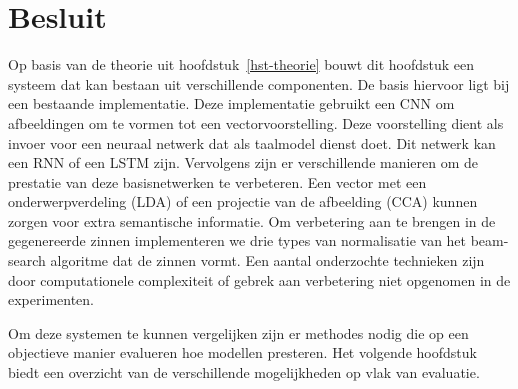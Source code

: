 \section{Besluit}
Op basis van de theorie uit hoofdstuk~\ref{hst-theorie} bouwt dit hoofdstuk een systeem dat kan bestaan uit verschillende componenten. De basis hiervoor ligt bij een bestaande implementatie. Deze implementatie gebruikt een CNN om afbeeldingen om te vormen tot een vectorvoorstelling. Deze voorstelling dient als invoer voor een neuraal netwerk dat als taalmodel dienst doet. Dit netwerk kan een RNN of een LSTM zijn. Vervolgens zijn er verschillende manieren om de prestatie van deze basisnetwerken te verbeteren.  Een vector met een onderwerpverdeling (LDA) of een projectie van de afbeelding (CCA) kunnen zorgen voor extra semantische informatie. Om verbetering aan te brengen in de gegenereerde zinnen implementeren we drie types van normalisatie van het beam-search algoritme dat de zinnen vormt. Een aantal onderzochte technieken zijn door computationele complexiteit of gebrek aan verbetering niet opgenomen in de experimenten. 

Om deze systemen te kunnen vergelijken zijn er methodes nodig die op een objectieve manier evalueren hoe modellen presteren. Het volgende hoofdstuk biedt een overzicht van de verschillende mogelijkheden op vlak van evaluatie.